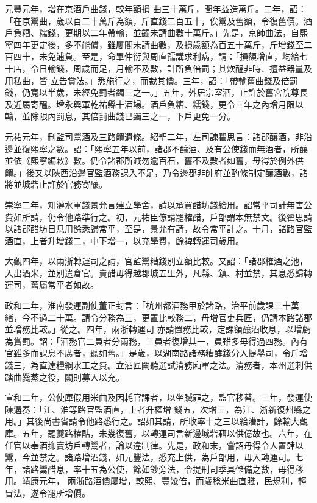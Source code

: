 \begin{pinyinscope}
 元豐元年，增在京酒戶曲錢，較年額損
 曲三十萬斤，閏年益造萬斤。二年，詔：「在京鬻曲，歲以百二十萬斤為額，斤直錢二百五十，俟鬻及舊額，令復舊價。酒戶負糟、糯錢，更期以二年帶輸，並蠲未請曲數十萬斤。」先是，京師曲法，自熙寧四年更定後，多不能償，雖屢閣未請曲數，及損歲額為百五十萬斤，斤增錢至二百四十，未免逋負。至是，命畢仲衍與周直孺講求利病，請：「損額增直，均給七十店，令日輸錢，周歲而足，月輸不及數，計所負倍罰；其炊醞非時、擅益器量及用私曲，皆
 立告賞法。」悉施行之，而裁其價。三年，詔：「帶輸舊曲錢及倍罰錢，仍寬以半歲，未經免罰者蠲三之一。」五年，外居宗室酒，止許於舊宮院尊長及近屬寄醞。增永興軍乾祐縣十酒場。酒戶負糟、糯錢，更令三年之內增月限以輸，並除限內罰息，其倍罰曲錢已蠲三之一，下戶更免一分。



 元祐元年，刪監司鬻酒及三路饋遺條。紹聖二年，左司諫翟思言：諸郡釀酒，非沿邊並復熙寧之數。詔：「熙寧五年以前，諸郡不釀酒、及有公使錢而無酒者，所釀
 並依《熙寧編敕》數。仍令諸郡所減勿逾百石，舊不及數者如舊，毋得於例外供饋。」後又以陜西沿邊官監酒務課入不足，乃令邊郡非帥府並酌條制定釀酒數，諸將並城砦止許於官務寄釀。



 崇寧二年，知漣水軍錢景允言建立學舍，請以承買醋坊錢給用。詔常平司計無害公費如所請，仍令他路準行之。初，元祐臣僚請罷榷醋，戶部謂本無禁文。後翟思請以諸郡醋坊日息用餘悉歸常平，至是，景允有請，故令常平計之。十月，諸路官監
 酒直，上者升增錢二，中下增一，以充學費，餘裨轉運司歲用。



 大觀四年，以兩浙轉運司之請，官監鬻糟錢別立額比較。又詔：「諸郡榷酒之池，入出酒米，並別遣倉官。賣醋毋得越郡城五里外，凡縣、鎮、村並禁，其息悉歸轉運司，舊屬常平者如故。



 政和二年，淮南發運副使董正封言：「杭州都酒務甲於諸路，治平前歲課三十萬緡，今不過二十萬。請令分務為三，更置比較務二，毋增官吏兵匠，仍請本路諸郡並增務比較。」從之。四年，兩浙轉運司
 亦請置務比較，定課額釀酒收息，以增虧為賞罰。詔：「酒務官二員者分兩務，三員者復增其一，員雖多毋得過四務。內有官雖多而課息不廣者，聽如舊。」是歲，以湖南路諸務糟酵錢分入提舉司，令斤增錢三，為直達糧綱水工之費。立酒匠闕聽選試清務廂軍之法。清務者，本州選刺供踏曲爨蒸之役，闕則募人以充。



 宣和二年，公使庫假用米曲及因耗官課者，以坐贓罪之，監官移替。三年，發運使陳遘奏：「江、淮等路官監酒直，上者升權增
 錢五，次增三，為江、浙新復州縣之用。」其後尚書省請令他路悉行之。詔如其請，所收率十之三以給漕計，餘輸大觀庫。五年，罷夔路榷酤，未幾復舊，以轉運司言新邊城砦藉以供億故也。六年，在任官以奉酒抑賣坊戶轉鬻者，論以違制律。先是，政和末，嘗詔毋得令人置肆以鬻，今並禁之。諸路增酒錢，如元豐法，悉充上供，為戶部用，毋入轉運司。七年，諸路鬻醋息，率十五為公使，餘如鈔旁法，令提刑司季具儲備之數，毋得移用。靖康元年，
 兩浙路酒價屢增，較熙、豐幾倍，而歲稔米曲直賤，民規利，輕冒法，遂令罷所增價。




\end{pinyinscope}
